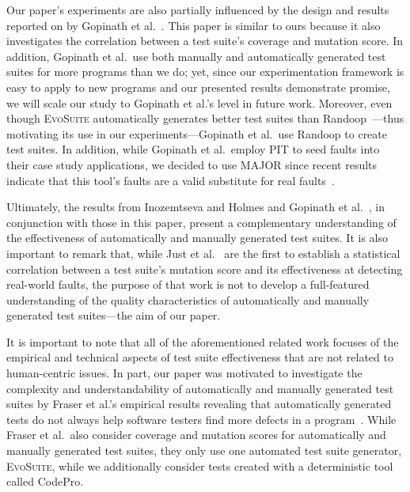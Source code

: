 Our paper's experiments are also partially influenced by the design and results reported on by Gopinath et al.~\cite{gopinath2014}.  This paper is similar to ours because it also investigates the correlation between a test suite's coverage and mutation score.  In addition, Gopinath et al.\ use both manually and automatically generated test suites for more programs than we do; yet, since our experimentation framework is easy to apply to new programs and our presented results demonstrate promise, we will scale our study to Gopinath et al.'s level in future work. Moreover, even though \textsc{EvoSuite} automatically generates better test suites than Randoop~\cite{fraser2013a}---thus motivating its use in our experiments---Gopinath et al.\ use Randoop to create test suites.  In addition, while Gopinath et al.\ employ PIT to seed faults into their case study applications, we decided to use MAJOR since recent results indicate that this tool's faults are a valid substitute for real faults~\cite{just2014}. 

Ultimately, the results from Inozemtseva and Holmes \cite{inozemtseva2014} and Gopinath et al.~\cite{gopinath2014}, in conjunction with those in this paper, present a complementary understanding of the effectiveness of automatically and manually generated test suites. It is also important to remark that, while Just et al.~\cite{just2014} are the first to establish a statistical correlation between a test suite's mutation score and its effectiveness at detecting real-world faults, the purpose of that work is not to develop a full-featured understanding of the quality characteristics of automatically and manually generated test suites---the aim of our paper.


It is important to note that all of the aforementioned related work focuses of the empirical and technical aspects of test suite effectiveness that are not related to human-centric issues.  In part, our paper was motivated to investigate the complexity and understandability of automatically and manually generated test suites by Fraser et al.'s empirical results revealing that automatically generated tests do not always help software testers find more defects in a program~\cite{fraser2013c}.  While Fraser et al.\ also consider coverage and mutation scores for automatically and manually generated test suites, they only use one automated test suite generator, \textsc{EvoSuite}, while we additionally consider tests created with a deterministic tool called CodePro.

